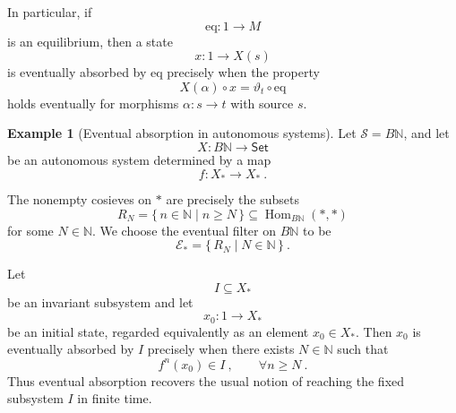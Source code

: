 \documentclass[a4paper,reqno,oneside]{amsart}
\theoremstyle{definition}
\newtheorem{example}[theorem]{Example}
\theoremstyle{remark}
\newcommand{\N}{\mathbb{N}}
\renewcommand{\theta}{\vartheta}
\numberwithin{equation}{section}
\begin{document}
	In particular, if
	\begin{equation}
		\mathrm{eq}\colon 1\to M
	\end{equation}
	is an equilibrium, then a state
	\begin{equation}
		x\colon 1\to X(s)
	\end{equation}
	is eventually absorbed by $\mathrm{eq}$ precisely when the property
	\begin{equation}
		X(\alpha)\circ x
		=
		\theta_t\circ \mathrm{eq}
	\end{equation}
	holds eventually for morphisms $\alpha\colon s\to t$ with source $s$.
	
	
	
	\begin{example}[Eventual absorption in autonomous systems]
		Let $\mathcal S=B\N$, and let
		\begin{equation}
			X\colon B\N\to\mathsf{Set}
		\end{equation}
		be an autonomous system determined by a map
		\begin{equation}
			f\colon X_*\to X_* \ .
		\end{equation}
		
		The nonempty cosieves on $*$ are precisely the subsets
		\begin{equation}
			R_N
			=
			\{\,n\in\N\mid n\geq N\,\}
			\subseteq \operatorname{Hom}_{B\N}(*,*)
		\end{equation}
		for some $N\in\N$. We choose the eventual filter on $B\N$ to be
		\begin{equation}
			\mathcal E_*
			=
			\{\,R_N\mid N\in\N\,\} \ .
		\end{equation}
		
		Let
		\begin{equation}
			I\subseteq X_*
		\end{equation}
		be an invariant subsystem and let
		\begin{equation}
			x_0\colon 1\to X_*
		\end{equation}
		be an initial state, regarded equivalently as an element $ x_0\in X_*$. Then $x_0$ is eventually absorbed by $I$ precisely when there exists $ N\in\N$ such that
		\begin{equation}
			f^n(x_0)\in I \ , \qquad  \forall n \geq N \ .
		\end{equation}
		Thus eventual absorption recovers the usual notion of reaching the fixed subsystem $I$ in finite time.
	\end{example}
	
\end{document}
